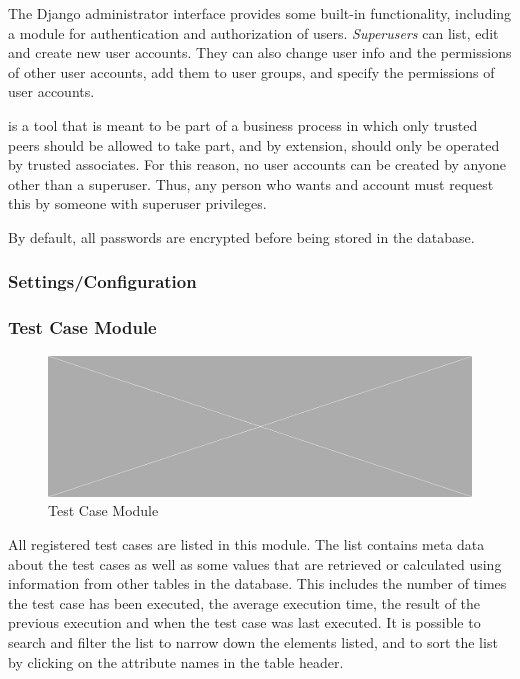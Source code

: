 \noindent The Django administrator interface provides some built-in functionality, including a module for authentication and authorization of users. \emph{Superusers} can list, edit and create new user accounts. They can also change user info and the permissions of other user accounts, add them to user groups, and specify the permissions of user accounts.

\toolname \space is a tool that is meant to be part of a business process in which only trusted peers should be allowed to take part, and by extension, \toolname \space should only be operated by trusted associates. For this reason, no user accounts can be created by anyone other than a superuser. Thus, any person who wants and account must request this by someone with superuser privileges. 

By default, all passwords are encrypted before being stored in the database.






\subsubsection{Settings/Configuration}







\subsubsection{Test Case Module}

\begin{figure}[h]
    \centering
    \includegraphics[width=\textwidth]{figures/placeholder.png}
    \caption{Test Case Module}
    \label{fig.tc_mod}
\end{figure}

All registered test cases are listed in this module. The list contains meta data about the test cases as well as some values that are retrieved or calculated using information from other tables in the database. This includes the number of times the test case has been executed, the average execution time, the result of the previous execution and when the test case was last executed.  It is possible to search and filter the list to narrow down the elements listed, and to sort the list by clicking on the attribute names in the table header.

